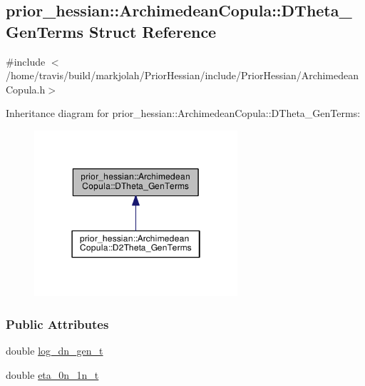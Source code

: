 \hypertarget{structprior__hessian_1_1ArchimedeanCopula_1_1DTheta__GenTerms}{}\subsection{prior\+\_\+hessian\+:\+:Archimedean\+Copula\+:\+:D\+Theta\+\_\+\+Gen\+Terms Struct Reference}
\label{structprior__hessian_1_1ArchimedeanCopula_1_1DTheta__GenTerms}


{\ttfamily \#include $<$/home/travis/build/markjolah/\+Prior\+Hessian/include/\+Prior\+Hessian/\+Archimedean\+Copula.\+h$>$}



Inheritance diagram for prior\+\_\+hessian\+:\+:Archimedean\+Copula\+:\+:D\+Theta\+\_\+\+Gen\+Terms\+:\nopagebreak
\begin{figure}[H]
\begin{center}
\leavevmode
\includegraphics[width=214pt]{structprior__hessian_1_1ArchimedeanCopula_1_1DTheta__GenTerms__inherit__graph}
\end{center}
\end{figure}
\subsubsection*{Public Attributes}
\begin{DoxyCompactItemize}
\item 
double \hyperlink{structprior__hessian_1_1ArchimedeanCopula_1_1DTheta__GenTerms_a53b2585e2895a634b563e6f7a27546db}{log\+\_\+dn\+\_\+gen\+\_\+t}
\item 
double \hyperlink{structprior__hessian_1_1ArchimedeanCopula_1_1DTheta__GenTerms_aad178f79e4a073efb684b19420a27644}{eta\+\_\+0n\+\_\+1n\+\_\+t}
\end{DoxyCompactItemize}


